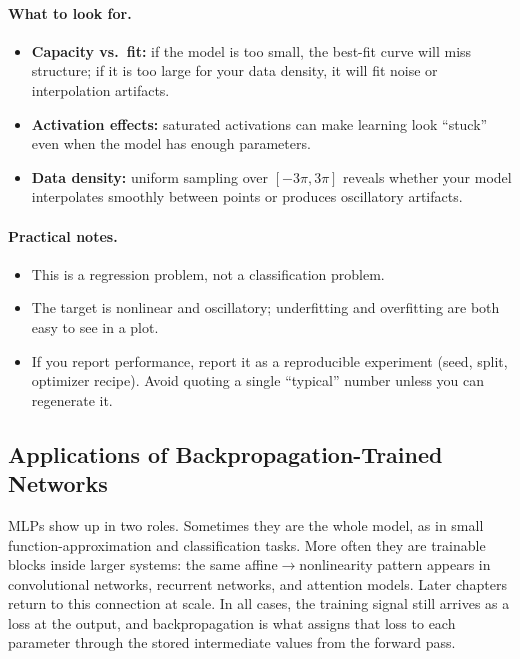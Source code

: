 \paragraph{What to look for.}
\begin{itemize}
    \item \textbf{Capacity vs.\ fit:} if the model is too small, the best\hyp{}fit curve will miss structure; if it is too large for your data density, it will fit noise or interpolation artifacts.
    \item \textbf{Activation effects:} saturated activations can make learning look ``stuck'' even when the model has enough parameters.
    \item \textbf{Data density:} uniform sampling over \([-3\pi,3\pi]\) reveals whether your model interpolates smoothly between points or produces oscillatory artifacts.
\end{itemize}

\paragraph{Practical notes.}
\begin{itemize}
    \item This is a regression problem, not a classification problem.
    \item The target is nonlinear and oscillatory; underfitting and overfitting are both easy to see in a plot.
    \item If you report performance, report it as a reproducible experiment (seed, split, optimizer recipe). Avoid quoting a single ``typical'' number unless you can regenerate it.
\end{itemize}

\subsection{Applications of Backpropagation-Trained Networks}
\label{sec:backprop_applications_of_multi_layer_perceptrons}

MLPs show up in two roles. Sometimes they are the whole model, as in small function-approximation and classification tasks. More often they are trainable blocks inside larger systems: the same affine\(\rightarrow\)nonlinearity pattern appears in convolutional networks, recurrent networks, and attention models. Later chapters return to this connection at scale. In all cases, the training signal still arrives as a loss at the output, and backpropagation is what assigns that loss to each parameter through the stored intermediate values from the forward pass.


